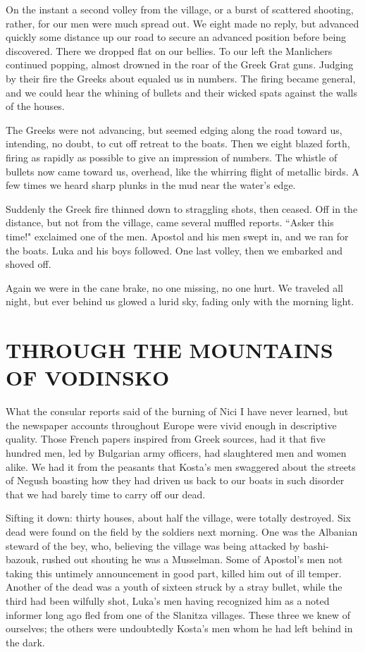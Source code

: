 \documentclass[a5paper,12pt]{book}
\begin{document}
On the instant a second volley from the village, or a burst of scattered shooting, rather, for our men were much spread out. We eight made no reply, but advanced quickly some distance up our road to secure an advanced position before being discovered. There we dropped flat on our bellies. To our left the Manlichers continued popping, almost drowned in the roar of the Greek Grat guns. Judging by their fire the Greeks about equaled us in numbers. The firing became general, and we could hear the whining of bullets and their wicked spats against the walls of the houses.

The Greeks were not advancing, but seemed edging along the road toward us, intending, no doubt, to cut off retreat to the boats. Then we eight blazed forth, firing as rapidly as possible to give an impression of numbers. The whistle of bullets now came toward us, overhead, like the whirring flight of metallic birds. A few times we heard sharp plunks in the mud near the water's edge.

Suddenly the Greek fire thinned down to straggling shots, then ceased. Off in the distance, but not from the village, came several muffled reports. “Asker this time!" exclaimed one of the men. Apostol and his men swept in, and we ran for the boats. Luka and his boys followed. One last volley, then we embarked and shoved off.

Again we were in the cane brake, no one missing, no one hurt. We traveled all night, but ever behind us glowed a lurid sky, fading only with the morning light.


\chapter{THROUGH THE MOUNTAINS OF VODINSKO}

What the consular reports said of the burning of Nici I have never learned, but the newspaper accounts throughout Europe were vivid enough in descriptive quality. Those French papers inspired from Greek sources, had it that five hundred men, led by Bulgarian army officers, had slaughtered men and women alike. We had it from the peasants that Kosta’s men swaggered about the streets of Negush boasting how they had driven us back to our boats in such disorder that we had barely time to carry off our dead.

Sifting it down: thirty houses, about half the village, were totally destroyed. Six dead were found on the field by the soldiers next morning. One was the Albanian steward of the bey, who, believing the village was being attacked by bashi-bazouk, rushed out shouting he was a Musselman. Some of Apostol’s men not taking this untimely announcement in good part, killed him out of ill temper. Another of the dead was a youth of sixteen struck by a stray bullet, while the third had been wilfully shot, Luka’s men having recognized him as a noted informer long ago fled from one of the Slanitza villages. These three we knew of ourselves; the others were undoubtedly Kosta’s men whom he had left behind in the dark.
\end{document}
